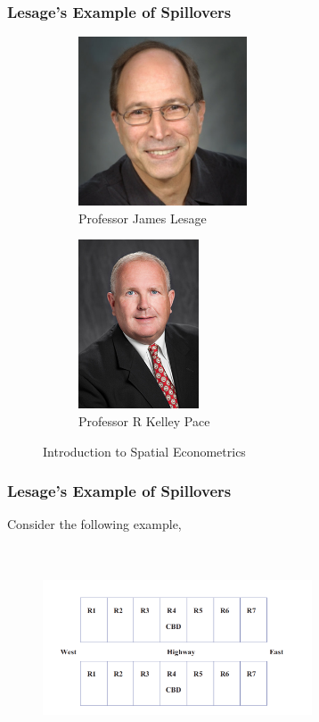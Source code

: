 \documentclass[english,10pt]{beamer}\usepackage[]{graphicx}\usepackage[]{xcolor}
\begin{document}
\begin{frame}
  \frametitle{Lesage's Example of Spillovers}
\begin{figure}
     \centering
     \begin{subfigure}[b]{0.49\columnwidth}
         \centering
         \includegraphics[height=5cm, width=\linewidth]{James_Lesage}
         \caption{Professor James Lesage}
     \end{subfigure}
     \hfill
     \begin{subfigure}[b]{0.4\columnwidth}
         \centering
         \includegraphics[height=5cm, width=\linewidth]{Pace}
         \caption{Professor R Kelley Pace}
     \end{subfigure}
        \caption{Introduction to Spatial Econometrics}
\end{figure}
\end{frame}


\begin{frame}
  \frametitle{Lesage's Example of Spillovers}
   Consider the following example,
     	\begin{figure}[H]
		    \centering 
		      \includegraphics[width = 8cm, height=6cm]{Lesage_ex.png}
	    \end{figure}
\end{frame}
\end{document}
